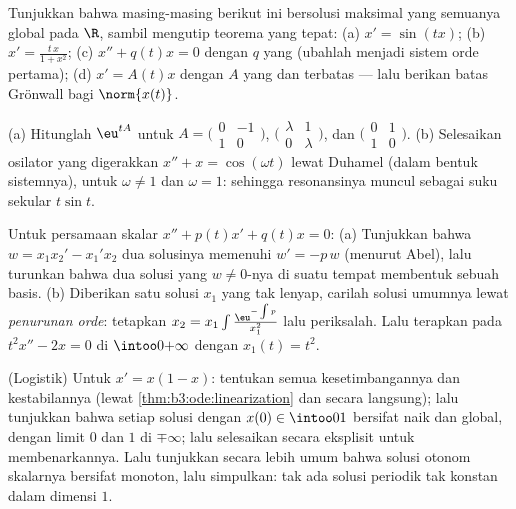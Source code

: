 \begin{exercise}[$\star\star$]\label{exo:b3:ode:3}
Tunjukkan bahwa masing-masing berikut ini bersolusi maksimal yang semuanya
global pada $\R$, sambil mengutip teorema yang tepat:
(a) $x' = \sin(tx)$;
(b) $x' = \frac{t\,x}{1 + x^2}$;
(c) $x'' + q(t)x = 0$ dengan $q$ yang  (ubahlah menjadi
sistem orde pertama);
(d) $x' = A(t)x$ dengan $A$ yang  dan terbatas --- lalu berikan
batas Grönwall bagi $\norm{x(t)}$.
\end{exercise}

\begin{exercise}[$\star\star$]\label{exo:b3:ode:4}
(a) Hitunglah $\eu^{tA}$ untuk
$A = \bigl(\begin{smallmatrix}0 & -1\\ 1 &
0\end{smallmatrix}\bigr)$,
$\bigl(\begin{smallmatrix}\lambda & 1\\ 0 &
\lambda\end{smallmatrix}\bigr)$, dan
$\bigl(\begin{smallmatrix}0 & 1\\ 1 &
0\end{smallmatrix}\bigr)$.
(b) Selesaikan osilator yang digerakkan $x'' + x = \cos(\omega t)$
lewat Duhamel (dalam bentuk sistemnya), untuk $\omega \neq 1$ dan $\omega =
1$: sehingga resonansinya muncul sebagai suku sekular $t\sin t$.
\end{exercise}

\begin{exercise}[$\star\star$]\label{exo:b3:ode:5}
Untuk persamaan skalar $x'' + p(t)x' + q(t)x = 0$:
(a) Tunjukkan bahwa  $w = x_1x_2' - x_1'x_2$ dua
solusinya memenuhi $w' = -p\,w$ (menurut Abel), lalu turunkan bahwa dua
solusi yang $w \neq 0$-nya di suatu tempat membentuk sebuah basis.
(b) Diberikan satu solusi $x_1$ yang tak lenyap, carilah solusi
umumnya lewat \emph{penurunan orde}: tetapkan $x_2 = x_1\int
\frac{\eu^{-\int p}}{x_1^2}$ lalu periksalah. Lalu terapkan pada $t^2x'' -
2x = 0$ di $\intoo0{+\infty}$ dengan $x_1(t) = t^2$.
\end{exercise}

\begin{exercise}[$\star\star$]\label{exo:b3:ode:6}
(Logistik) Untuk $x' = x(1 - x)$: tentukan semua kesetimbangannya dan
kestabilannya (lewat \cref{thm:b3:ode:linearization} dan
secara langsung); lalu tunjukkan bahwa setiap solusi dengan $x(0) \in \intoo01$ bersifat
naik dan global, dengan limit $0$ dan $1$ di $\mp\infty$;
lalu selesaikan secara eksplisit untuk membenarkannya. Lalu tunjukkan secara lebih umum bahwa
solusi otonom skalarnya bersifat monoton, lalu simpulkan:
tak ada solusi periodik tak konstan dalam dimensi $1$.
\end{exercise}

